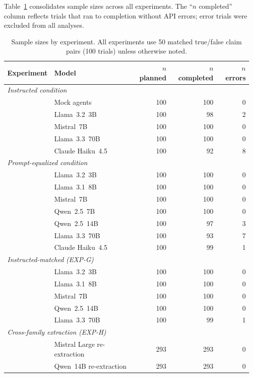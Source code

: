 Table~\ref{tab:sample_sizes} consolidates sample sizes across all experiments. The ``$n$ completed'' column reflects trials that ran to completion without API errors; error trials were excluded from all analyses.

\begin{table}[h]
\centering
\caption{Sample sizes by experiment. All experiments use 50 matched true/false claim pairs (100 trials) unless otherwise noted.}
\label{tab:sample_sizes}
\begin{small}
\begin{tabular}{llrrr}
\toprule
\textbf{Experiment} & \textbf{Model} & \textbf{$n$ planned} & \textbf{$n$ completed} & \textbf{$n$ errors} \\
\midrule
\multicolumn{5}{l}{\emph{Instructed condition}} \\
& Mock agents & 100 & 100 & 0 \\
& Llama~3.2~3B & 100 & 98 & 2 \\
& Mistral~7B & 100 & 100 & 0 \\
& Llama~3.3~70B & 100 & 100 & 0 \\
& Claude Haiku~4.5 & 100 & 92 & 8 \\
\midrule
\multicolumn{5}{l}{\emph{Prompt-equalized condition}} \\
& Llama~3.2~3B & 100 & 100 & 0 \\
& Llama~3.1~8B & 100 & 100 & 0 \\
& Mistral~7B & 100 & 100 & 0 \\
& Qwen~2.5~7B & 100 & 100 & 0 \\
& Qwen~2.5~14B & 100 & 97 & 3 \\
& Llama~3.3~70B & 100 & 93 & 7 \\
& Claude Haiku~4.5 & 100 & 99 & 1 \\
\midrule
\multicolumn{5}{l}{\emph{Instructed-matched (EXP-G)}} \\
& Llama~3.2~3B & 100 & 100 & 0 \\
& Llama~3.1~8B & 100 & 100 & 0 \\
& Mistral~7B & 100 & 100 & 0 \\
& Qwen~2.5~14B & 100 & 100 & 0 \\
& Llama~3.3~70B & 100 & 99 & 1 \\
\midrule
\multicolumn{5}{l}{\emph{Cross-family extraction (EXP-H)}} \\
& Mistral Large re-extraction & 293 & 293 & 0 \\
& Qwen~14B re-extraction & 293 & 293 & 0 \\
\bottomrule
\end{tabular}
\end{small}
\end{table}

